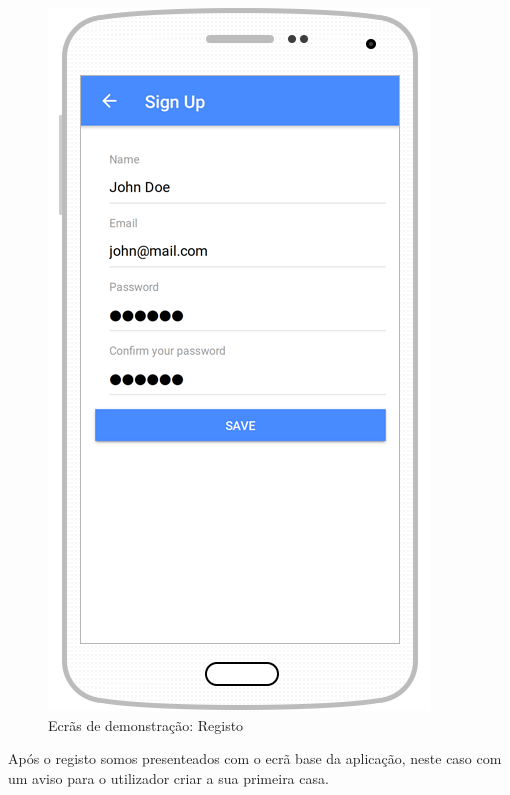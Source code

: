 \begin{figure}[H]
  \centering
        \includegraphics[scale=0.75]{img/demo/register.png}
  \caption{Ecrãs de demonstração: Registo}
\end{figure}

Após o registo somos presenteados com o ecrã base da aplicação, neste caso com um aviso para o utilizador criar a sua primeira casa. 

